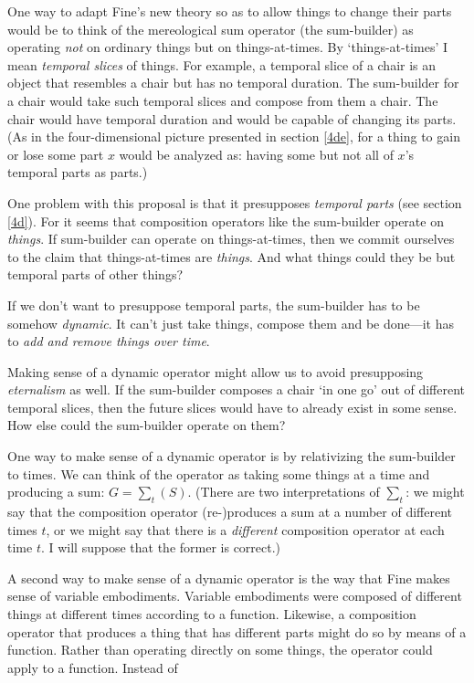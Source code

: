 \documentclass[11pt]{article}
\begin{document}
\begin{spacing}{1.5}
One way to adapt Fine's new theory so as to allow things to change
their parts would be to think of the mereological sum operator (the
sum-builder) as operating {\em not} on ordinary things but on
things-at-times.  By `things-at-times' I mean {\em temporal slices} of
things.  For example, a temporal slice of a chair is an object that
resembles a chair but has no temporal duration.  The sum-builder for a
chair would take such temporal slices and compose from them a chair.
The chair would have temporal duration and would be capable of
changing its parts.  (As in the four-dimensional picture presented in
section \ref{4de}, for a thing to gain or lose some part $x$ would be
analyzed as: having some but not all of $x$'s temporal parts as
parts.)

One problem with this proposal is that it presupposes {\em temporal
  parts} (see section \ref{4d}).  For it seems that composition
operators like the sum-builder operate on {\em things}.  If
sum-builder can operate on things-at-times, then we commit ourselves
to the claim that things-at-times are {\em things}.  And what things
could they be but temporal parts of other things?

If we don't want to presuppose temporal parts, the sum-builder has to
be somehow \emph{dynamic}. It can't just take things, compose them and
be done---it has to \emph{add and remove things over time}.

Making sense of a dynamic operator might allow us to avoid
presupposing {\em eternalism} as well.  If the sum-builder composes a
chair `in one go' out of different temporal slices, then the future
slices would have to already exist in some sense.  How else could the
sum-builder operate on them?

One way to make sense of a dynamic operator is by relativizing the
sum-builder to times.  We can think of the operator as taking some
things at a time and producing a sum: $G = \sum _{t} (S)$.  (There are
two interpretations of $\sum _{t}$: we might say that the composition
operator (re-)produces a sum at a number of different times $t$, or we
might say that there is a {\em different} composition operator at each
time $t$.  I will suppose that the former is correct.)

A second way to make sense of a dynamic operator is the way that Fine
makes sense of variable embodiments.  Variable embodiments were
composed of different things at different times according to a
function.  Likewise, a composition operator that produces a thing that
has different parts might do so by means of a function.  Rather than
operating directly on some things, the operator could apply to a
function.  Instead of


\end{spacing}
\end{document}

